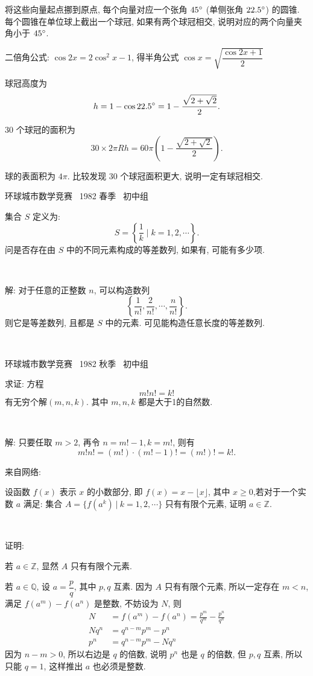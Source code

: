 将这些向量起点挪到原点, 每个向量对应一个张角 $ 45 \degree $ (单侧张角 $ 22.5 \degree $) 的圆锥. 每个圆锥在单位球上截出一个球冠, 如果有两个球冠相交, 说明对应的两个向量夹角小于 $ 45 \degree $.

二倍角公式: $ \cos 2x = 2 \cos^2 x - 1 $, 得半角公式 $ \cos x = \sqrt{ \dfrac{\cos 2x+1}{2} } $

球冠高度为 \[ h = 1 - \cos 22.5\degree = 1 - \frac{\sqrt{2+\sqrt{2}}}{2} .\]

30 个球冠的面积为 \[ 30\times 2\pi Rh = 60\pi \left( 1 - \frac{\sqrt{2+\sqrt{2}}}{2} \right).\]

球的表面积为 $ 4\pi $. 比较发现 30 个球冠面积更大, 说明一定有球冠相交.

\newpage


\noindent 环球城市数学竞赛~ 1982 春季~ 初中组

集合 $ S $ 定义为: \[ S = \left\{ \frac{1}{k} \mid k = 1, 2, \cdots \right\} .\] 问是否存在由 $ S $ 中的不同元素构成的等差数列, 如果有, 可能有多少项.

~

解: 对于任意的正整数 $ n $, 可以构造数列 \[ \left\{ \frac{1}{n!}, \frac{2}{n!}, \cdots, \frac{n}{n!} \right\}. \]
则它是等差数列, 且都是 $ S $ 中的元素. 可见能构造任意长度的等差数列.

~


\noindent 环球城市数学竞赛~ 1982 秋季~ 初中组

求证: 方程
\[m!n!=k!\]
有无穷个解$(m,n,k)$. 其中 $m,n,k$ 都是大于1的自然数.

~

解: 只要任取 $m>2$, 再令 $n = m!-1, k=m!$, 则有 
$$m!n!=(m!)\cdot(m!-1)!=(m!)!=k! .$$


\newpage

\noindent 来自网络:

设函数 $f(x)$ 表示 $x$ 的小数部分, 即 $f(x) = x - \lfloor x \rfloor$, 其中 $x\ge 0$,若对于一个实数 $a$ 满足: 集合 $A = \{ f(a^k)\ |\ k = 1,2,\cdots \}$ 只有有限个元素, 证明 $a\in \mathbb{Z}$.

~

\noindent 证明: 

若 $a\in \mathbb{Z}$, 显然 $A$ 只有有限个元素.

若 $a \in \mathbb{Q}$, 设 $a = \dfrac{p}{q}$, 其中 $p,q$ 互素. 因为 $A$ 只有有限个元素, 所以一定存在 $m < n$, 满足 $f(a^m) - f(a^n)$ 是整数, 不妨设为 $N$, 则
\begin{align*}
N &= f(a^m) - f(a^n) = \frac{p^m}{q^m} - \frac{p^n}{q^n}\\
Nq^n & = q^{n-m}p^m - p^n\\
p^n &= q^{n-m}p^m - Nq^n
\end{align*}
因为 $n-m > 0$, 所以右边是 $q$ 的倍数, 说明 $p^n$ 也是  $q$ 的倍数, 但 $p,q$ 互素, 所以只能 $q=1$, 这样推出 $a$ 也必须是整数. 

